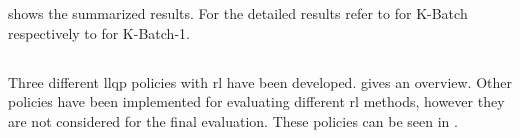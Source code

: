 \documentclass{seal_thesis}
\begin{document}
 shows the summarized results. For the detailed results refer to  for K-Batch respectively to  for K-Batch-1.

\begin{table}[!ht]
\centering
{}
\caption{Reduction (in \%) across all \glspl{kpi} of the batch policies with \gls{rl} against the \gls{msa} solver}
\label{tab:rl_batch_kpis_comp_gain}
\end{table}

\subsection{}
\label{subsec:rl_llqp}

Three different \gls{llqp} policies with \gls{rl} have been developed.  gives an overview. Other policies have been implemented for evaluating different \gls{rl} methods, however they are not considered for the final evaluation. These policies can be seen in .
\end{document}
